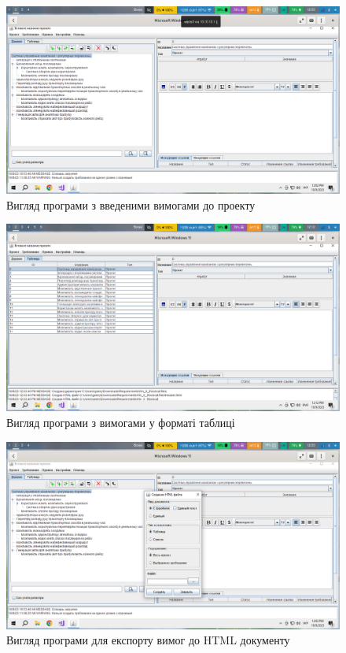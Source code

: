 \documentclass[14pt]{extreport}
\begin{document}
\begin{normalsize}
\begin{figure}[H]
	\centering
	\includegraphics[scale=0.35]{3}
	\caption{Вигляд програми з введеними вимогами до проекту}
\end{figure}


\begin{figure}[H]
	\centering
	\includegraphics[scale=0.35]{4}
	\caption{Вигляд програми з вимогами у форматі таблиці}
\end{figure}



\begin{figure}[H]
	\centering
	\includegraphics[scale=0.35]{5}
	\caption{Вигляд програми для експорту вимог до HTML документу}
\end{figure}



\end{normalsize}
\end{document}
